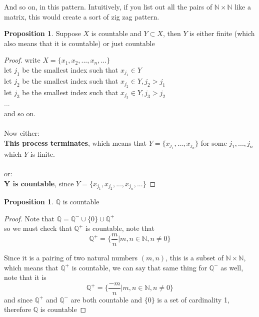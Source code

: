 \documentclass[12pt]{article}
\theoremstyle{plain}
\theoremstyle{definition}
\newtheorem{proposition}[theorem]{Proposition}
\begin{document}
And so on, in this pattern. Intuitively, if you list out all the pairs of $\mathbb{N} \times  \mathbb{N}$ like a matrix, this would create a sort of zig zag pattern.

\begin{proposition}
	Suppose $X$ is countable and $Y \subset X$, then $Y$ is either finite (which also means that it is countable) or just countable
\end{proposition}

\begin{proof}
	write $X = \{ x_1, x_2, ..., x_n, ... \}$\\
	let $j_1$ be the smallest index such that $x_{j_1} \in Y$\\
	let $j_2$ be the smallest index such that $x_{j_2} \in Y, j_2 > j_1$\\
	let $j_3$ be the smallest index such that $x_{j_3} \in Y, j_3 > j_2$\\
	...\\
	and so on.\\
	\\
	Now either:\\
	\textbf{This process terminates}, which means that $Y = \{ x_{j_1} , ..., x_{j_n} \}$ for some $j_1, ..., j_n$ which $Y$ is finite.\\
	\\
	or:\\
	\textbf{Y is countable}, since $Y = \{ x_{j_1}, x_{j_2} ,..., x_{j_n}, ... \}$
\end{proof}

\begin{proposition}
	$\mathbb{Q}$ is countable
\end{proposition}

\begin{proof}
	Note that $\mathbb{Q} = \mathbb{Q}^- \cup \{ 0 \} \cup \mathbb{Q}^+$\\
	so we must check that $\mathbb{Q}^+$ is countable, note that
	$$\mathbb{Q}^+ = \{ \frac{m}{n} | m,n \in \mathbb{N}, n \neq 0 \}$$
	
	Since it is a pairing of two natural numbers $(m,n)$, this is a subset of $\mathbb{N} \times \mathbb{N}$, which means that $\mathbb{Q}^+$ is countable, we can say that same thing for $\mathbb{Q}^-$ as well, note that it is
	$$\mathbb{Q}^+ = \{ \frac{-m}{n} | m,n \in \mathbb{N}, n \neq 0 \}$$
	and since $\mathbb{Q}^+$ and $\mathbb{Q}^-$ are both countable and $\{ 0 \}$ is a set of cardinality 1, therefore $\mathbb{Q}$ is countable
\end{proof}
\end{document}
